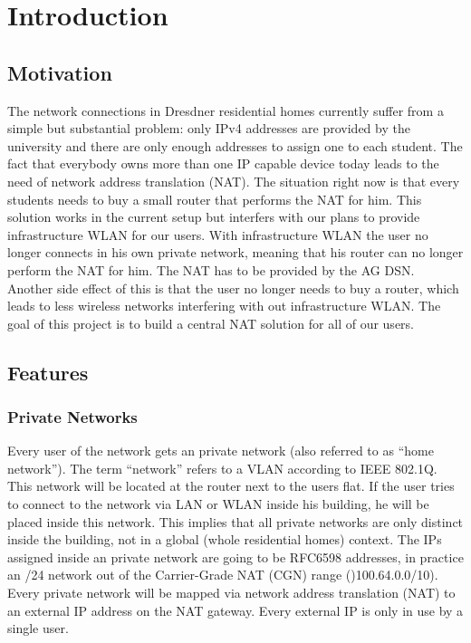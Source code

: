 \documentclass{report}
\begin{document}
\chapter{Introduction}\label{introduction}

\section{Motivation}\label{motivation}

The network connections in Dresdner residential homes currently suffer
from a simple but substantial problem: only IPv4 addresses are provided
by the university and there are only enough addresses to assign one to
each student. The fact that everybody owns more than one IP capable device
today leads to the need of network address translation (NAT). The situation right now is that
every students needs to buy a small router that performs the NAT for him. This solution works
in the current setup but interfers with our plans to provide infrastructure WLAN for our users.
With infrastructure WLAN the user no longer connects in his own private network, meaning that his router can no longer 
perform the NAT for him. The NAT has to be provided by the AG DSN. Another side effect
of this is that the user no longer needs to buy a router, which leads to less wireless networks 
interfering with out infrastructure WLAN. The goal of this project is to build a central NAT solution
for all of our users.

\section{Features}\label{features}

\subsection{Private Networks}\label{private-networks}

Every user of the network gets an private network (also
referred to as ``home network''). The term ``network'' refers to a VLAN
according to IEEE 802.1Q\cite{802.1Q}. This network will be located at the router
next to the users flat. If the user tries to connect to the network via
LAN or WLAN inside his building, he will be placed inside this network. This
implies that all private networks are only distinct inside the building,
not in a global (whole residential homes) context. The IPs assigned inside an private network are
going to be RFC6598 addresses\cite{CGN}, in practice an /24 network out of the
Carrier-Grade NAT (CGN) range ()100.64.0.0/10). Every private network
will be mapped via network address translation (NAT\cite{NAT}) to an external IP
address on the NAT gateway. Every external IP is only in use by a single user.
\end{document}
